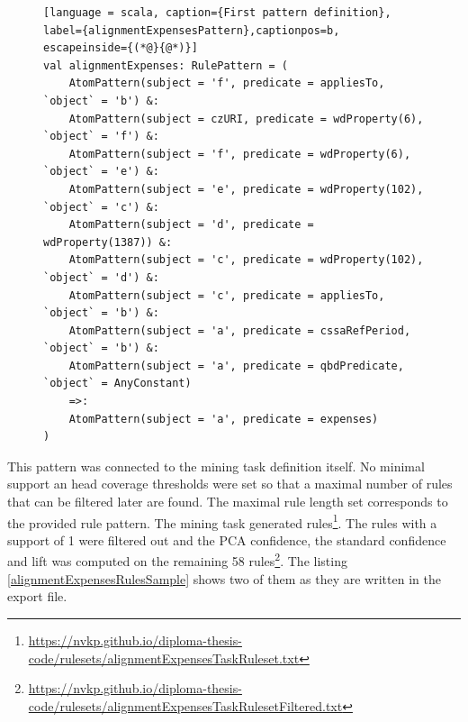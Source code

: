 \begin{figure}[h]
\begin{lstlisting}[language = scala, caption={First pattern definition}, label={alignmentExpensesPattern},captionpos=b, escapeinside={(*@}{@*)}]
val alignmentExpenses: RulePattern = (
    AtomPattern(subject = 'f', predicate = appliesTo, `object` = 'b') &:
    AtomPattern(subject = czURI, predicate = wdProperty(6), `object` = 'f') &:
    AtomPattern(subject = 'f', predicate = wdProperty(6), `object` = 'e') &:
    AtomPattern(subject = 'e', predicate = wdProperty(102), `object` = 'c') &:  
    AtomPattern(subject = 'd', predicate = wdProperty(1387)) &:
    AtomPattern(subject = 'c', predicate = wdProperty(102), `object` = 'd') &:
    AtomPattern(subject = 'c', predicate = appliesTo, `object` = 'b') &:
    AtomPattern(subject = 'a', predicate = cssaRefPeriod, `object` = 'b') &:
    AtomPattern(subject = 'a', predicate = qbdPredicate, `object` = AnyConstant)
    =>:
    AtomPattern(subject = 'a', predicate = expenses)
)
\end{lstlisting}
\end{figure}

This pattern was connected to the mining task definition itself. No minimal support an head coverage thresholds were set so that a maximal number of rules that can be filtered later are found. The maximal rule length set corresponds to the provided rule pattern. The mining task generated  rules\footnote{\href{https://nvkp.github.io/diploma-thesis-code/rulesets/alignmentExpensesTaskRuleset.txt}{https://nvkp.github.io/diploma-thesis-code/rulesets/alignmentExpensesTaskRuleset.txt}}. The rules with a support of 1 were filtered out and the PCA confidence, the standard confidence and lift was computed on the remaining 58 rules\footnote{\href{https://nvkp.github.io/diploma-thesis-code/rulesets/alignmentExpensesTaskRulesetFiltered.txt}{https://nvkp.github.io/diploma-thesis-code/rulesets/alignmentExpensesTaskRulesetFiltered.txt}}. The listing \ref{alignmentExpensesRulesSample} shows two of them as they are written in the export file.

